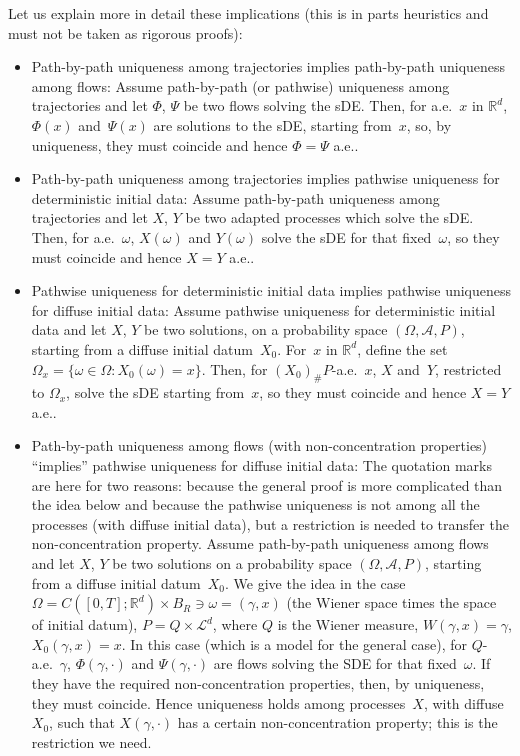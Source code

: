 \documentclass[a4paper,10pt]{article}
\newcommand\1{\mathbbm{1}}
\newcommand{\mc}{\mathcal}
\numberwithin{equation}{section}
\begin{document}
Let us explain more in detail these implications (this is in parts heuristics and must not be taken as rigorous proofs):
\begin{itemize}
\item Path-by-path uniqueness among trajectories implies path-by-path uniqueness among flows: Assume path-by-path (or pathwise) uniqueness among trajectories and let $\Phi$, $\Psi$ be two flows solving the sDE. Then, for a.e.~$x$ in $\mathbb{R}^d$, $\Phi(x)$ and~$\Psi(x)$ are solutions to the sDE, starting from~$x$, so, by uniqueness, they must coincide and hence $\Phi=\Psi$ a.e..
\item Path-by-path uniqueness among trajectories implies pathwise uniqueness for de\-terministic initial data: Assume path-by-path uniqueness among trajectories and let $X$, $Y$ be two adapted processes which solve the sDE. Then, for a.e.~$\omega$, $X(\omega)$ and $Y(\omega)$ solve the sDE for that fixed~$\omega$, so they must coincide and hence $X=Y$ a.e..
\item Pathwise uniqueness for deterministic initial data implies pathwise uniqueness for diffuse initial data: Assume pathwise uniqueness for deterministic initial data and let $X$, $Y$ be two solutions, on a probability space $(\Omega,\mc{A},P)$, starting from a diffuse initial datum~$X_0$. For~$x$ in $\mathbb{R}^d$, define the set $\Omega_x=\{\omega\in\Omega \colon X_0(\omega)=x\}$. Then, for $(X_0)_\#P$-a.e.~$x$, $X$ and~$Y$, restricted to $\Omega_x$, solve the sDE starting from~$x$, so they must coincide and hence $X=Y$ a.e..
\item Path-by-path uniqueness among flows (with non-concentration properties) ``implies'' pathwise uniqueness for diffuse initial data: The quotation marks are here for two reasons: because the general proof is more complicated than the idea below and because the pathwise uniqueness is not among all the processes (with diffuse initial data), but a restriction is needed to transfer the non-concentration property. Assume path-by-path uniqueness among flows and let $X$, $Y$ be two solutions on a probability space $(\Omega,\mc{A},P)$, starting from a diffuse initial datum~$X_0$. We give the idea in the case $\Omega=C([0,T];\mathbb{R}^d)\times B_R\ni\omega=(\gamma,x)$ (the Wiener space times the space of initial datum), $P=Q\times\mc{L}^d$, where $Q$ is the Wiener measure, $W(\gamma,x)=\gamma$, $X_0(\gamma,x)=x$. In this case (which is a model for the general case), for $Q$-a.e.~$\gamma$, $\Phi(\gamma,\cdot)$ and $\Psi(\gamma,\cdot)$ are flows solving the SDE for that fixed~$\omega$. If they have the required non-concentration properties, then, by uniqueness, they must coincide. Hence uniqueness holds among processes~$X$, with diffuse~$X_0$, such that $X(\gamma,\cdot)$ has a certain non-concentration property; this is the restriction we need.
\end{itemize}
\end{document}
